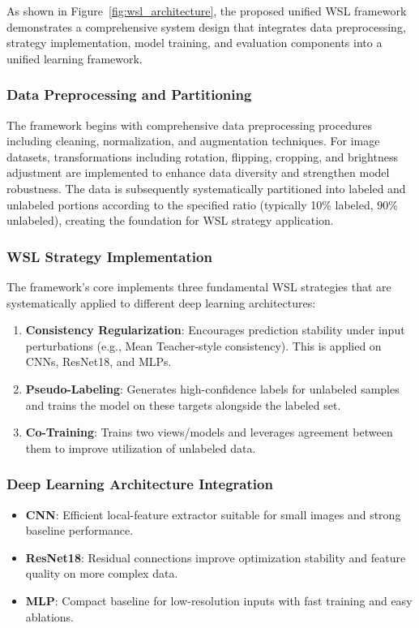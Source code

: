 \documentclass{ieeeaccess}
\begin{document}
As shown in Figure~\ref{fig:wsl_architecture}, the proposed unified WSL framework demonstrates a comprehensive system design that integrates data preprocessing, strategy implementation, model training, and evaluation components into a unified learning framework.

\subsubsection{Data Preprocessing and Partitioning}
The framework begins with comprehensive data preprocessing procedures including cleaning, normalization, and augmentation techniques. For image datasets, transformations including rotation, flipping, cropping, and brightness adjustment are implemented to enhance data diversity and strengthen model robustness. The data is subsequently systematically partitioned into labeled and unlabeled portions according to the specified ratio (typically 10\% labeled, 90\% unlabeled), creating the foundation for WSL strategy application.

\subsubsection{WSL Strategy Implementation}
The framework's core implements three fundamental WSL strategies that are systematically applied to different deep learning architectures:

\begin{enumerate}
\item \textbf{Consistency Regularization}: Encourages prediction stability under input perturbations (e.g., Mean Teacher-style consistency). This is applied on CNNs, ResNet18, and MLPs.
\item \textbf{Pseudo-Labeling}: Generates high-confidence labels for unlabeled samples and trains the model on these targets alongside the labeled set.
\item \textbf{Co-Training}: Trains two views/models and leverages agreement between them to improve utilization of unlabeled data.
\end{enumerate}

\subsubsection{Deep Learning Architecture Integration}
\begin{itemize}
\item \textbf{CNN}: Efficient local-feature extractor suitable for small images and strong baseline performance.
\item \textbf{ResNet18}: Residual connections improve optimization stability and feature quality on more complex data.
\item \textbf{MLP}: Compact baseline for low-resolution inputs with fast training and easy ablations.
\end{itemize}
\end{document}
